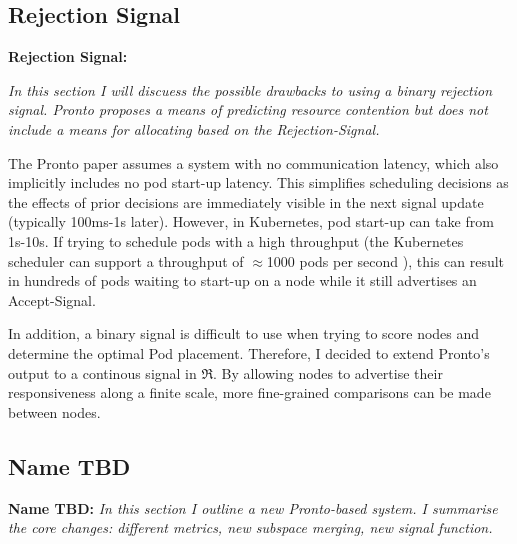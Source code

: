 \subsection{Rejection Signal}
\begin{tcolorbox}[boxsep=0mm,left=2.5mm,right=2.5mm]
    \textbf{Rejection Signal:} {\em In this section I will discuess the possible
    drawbacks to using a binary rejection signal. Pronto proposes a means
    of predicting resource contention but does not include a means for
    allocating based on the Rejection-Signal.

    The Pronto paper assumes a system with no communication latency, which also
    implicitly includes no pod start-up latency. This simplifies
    scheduling decisions as the effects of prior decisions are immediately
    visible in the next signal update (typically 100ms-1s later). However, in
    Kubernetes, pod start-up can take from 1s-10s. If trying to schedule pods
    with a high throughput (the Kubernetes scheduler can support a throughput of
    $\approx$1000 pods per second \cite{qadeer_scaling_2022}), this can result in
    hundreds of pods waiting to start-up on a node while it still advertises an
    Accept-Signal.

    In addition, a binary signal is difficult to use when trying to score nodes
    and determine the optimal Pod placement. Therefore, I decided to extend
    Pronto's output to a continous signal in $\Re$. By allowing nodes to
    advertise their responsiveness along a finite scale, more fine-grained
    comparisons can be made between nodes.}
\end{tcolorbox}

\subsection{Name TBD}
\begin{tcolorbox}[boxsep=0mm,left=2.5mm,right=2.5mm]
    \textbf{Name TBD:} {\em In this section I outline a new Pronto-based system.
    I summarise the core changes: different metrics, new subspace merging,
    new signal function. }
\end{tcolorbox}

